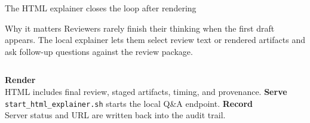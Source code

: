 \documentclass[aspectratio=169,professionalfonts]{beamer}
\newcommand{\artifact}[1]{\texttt{\footnotesize #1}}
\newcommand{\claim}[1]{\textbf{\color{llnlblue}#1}}
\begin{document}
\begin{frame}{The HTML explainer closes the loop after rendering}
  \begin{block}{Why it matters}
    Reviewers rarely finish their thinking when the first draft appears. The
    local explainer lets them select review text or rendered artifacts and ask
    follow-up questions against the review package.
  \end{block}

  \vspace{0.7em}
  \begin{columns}[T,onlytextwidth]
      \claim{Render}\\
      HTML includes final review, staged artifacts, timing, and provenance.
      \claim{Serve}\\
      \artifact{start\_html\_explainer.sh} starts the local Q\&A endpoint.
      \claim{Record}\\
      Server status and URL are written back into the audit trail.
  \end{columns}

\end{frame}
\end{document}
